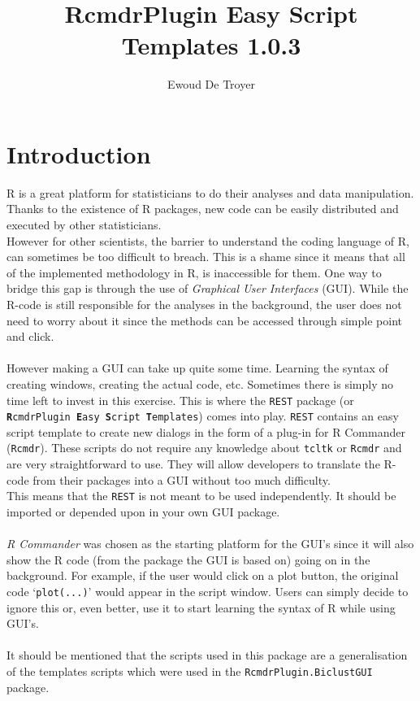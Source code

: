 \documentclass[a4paper]{article}\usepackage[]{graphicx}\usepackage[]{color}
\title{RcmdrPlugin Easy Script Templates 1.0.3}
\author{Ewoud De Troyer}
\date{}
\begin{document}
\maketitle
\tableofcontents
\newpage
\section{Introduction}
R is a great platform for statisticians to do their analyses and data
manipulation. Thanks to the existence of R packages, new code can be easily
distributed and executed by other statisticians.\\
However for other scientists, the barrier to understand the coding language of
R, can sometimes be too difficult to breach. This is a shame since it means that
all of the implemented methodology in R, is inaccessible for them. One way to
bridge this gap is through the use of {\it Graphical User Interfaces} (GUI). While the R-code is
still responsible for the analyses in the background, the user does not need to
worry about it since the methods can be accessed through simple point and click.
\\ \\
However making a GUI can take up quite some time. Learning the syntax of
creating windows, creating the actual code, etc. Sometimes there is simply no
time left to invest in this exercise. This is where the \texttt{REST} package (or
\texttt{{\bf R}cmdrPlugin {\bf E}asy {\bf S}cript {\bf T}emplates}) comes into
play. \texttt{REST} contains an easy script template to create new dialogs in
the form of a plug-in for R Commander (\texttt{Rcmdr}). These scripts do not
require any knowledge about \texttt{tcltk} or \texttt{Rcmdr} and are very
straightforward to use. They will allow developers to translate the R-code from
their packages into a GUI without too much difficulty.\\
This means that the \texttt{REST} is not meant to be used independently. It
should be imported or depended upon in your own GUI package.
\\ \\
{\it R Commander} was chosen as the starting platform for the GUI's since it
will also show the R code (from the package the GUI is based on) going on in the
background. For example, if the user would click on a plot button, the original
code `\texttt{plot(...)}' would appear in the script window. Users can simply
decide to ignore this or, even better, use it to start learning the syntax of R
while using GUI's.
\\ \\
It should be mentioned that the scripts used in this package are a
generalisation of the templates scripts which were used in the
\texttt{RcmdrPlugin.BiclustGUI} package.
\end{document}
